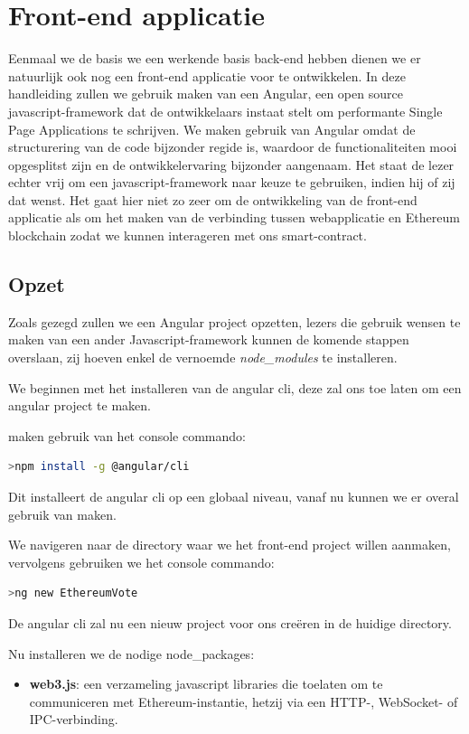 	\section{Front-end applicatie}
	Eenmaal we de basis we een werkende basis back-end hebben dienen we er natuurlijk ook nog een front-end applicatie voor te ontwikkelen. In deze handleiding zullen we gebruik maken van een Angular, een open source javascript-framework dat de ontwikkelaars instaat stelt om performante Single Page Applications te schrijven. We maken gebruik van Angular omdat de structurering  van de code bijzonder regide is, waardoor de functionaliteiten mooi opgesplitst zijn en de ontwikkelervaring bijzonder aangenaam.  Het staat de lezer echter vrij om een javascript-framework naar keuze te gebruiken, indien hij of zij dat wenst. Het gaat hier  niet zo zeer om de ontwikkeling van de front-end applicatie als om het maken van de verbinding tussen webapplicatie en Ethereum blockchain zodat we kunnen interageren met ons smart-contract. 
	
	\subsection{Opzet}
	Zoals gezegd zullen we een Angular project opzetten, lezers die gebruik wensen te maken van een ander Javascript-framework kunnen de komende stappen overslaan, zij hoeven enkel de vernoemde \textit{node\_modules } te installeren. 
	
	We beginnen met het installeren van de angular cli, deze zal ons toe laten om een angular project te maken.
	
	maken gebruik van het console commando:
	\begin{lstlisting}[numbers=none,language=bash]
	>npm install -g @angular/cli
	\end{lstlisting}
	Dit installeert de angular cli op een globaal niveau, vanaf nu kunnen we er overal gebruik van maken.
	
	We navigeren naar de directory waar we het front-end project willen aanmaken, vervolgens gebruiken we het console commando:
	\begin{lstlisting}[numbers=none,language=bash]
	>ng new EthereumVote
	\end{lstlisting}
	De angular cli zal nu een nieuw project voor ons creëren in de huidige directory. 
	
	Nu installeren we de nodige node\_packages:
	\begin{itemize}
		\item \textbf{web3.js}: een verzameling javascript libraries  die toelaten om te communiceren met Ethereum-instantie, hetzij via  een HTTP-, WebSocket- of IPC-verbinding.
	\end{itemize}
	
